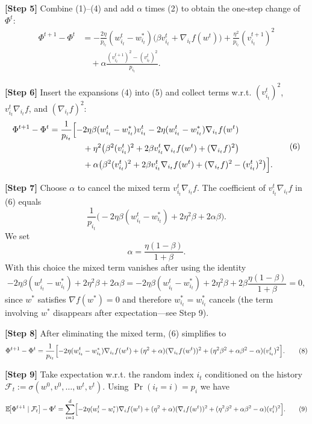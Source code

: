 \documentclass{article}
\newcommand{\E}{\mathbb{E}}
\begin{document}
\noindent\textbf{[Step 5]} Combine (1)–(4) and add $\alpha$ times (2) to obtain the one‑step change of $\Phi^{t}$:
\[
\begin{aligned}
\Phi^{t+1}-\Phi^{t}
&= -\frac{2\eta}{p_{i_t}}(w^{t}_{i_t}-w^{*}_{i_t})\bigl(\beta v^{t}_{i_t}+ \nabla_{i_t}f(w^{t})\bigr)
   +\frac{\eta^{2}}{p_{i_t}}(v^{t+1}_{i_t})^{2}   \\
&\quad +\alpha\frac{(v^{t+1}_{i_t})^{2}-(v^{t}_{i_t})^{2}}{p_{i_t}} .
\end{aligned}
\tag{5}
\]

\noindent\textbf{[Step 6]} Insert the expansions (4) into (5) and collect terms w.r.t. $(v^{t}_{i_t})^{2}$, $v^{t}_{i_t}\nabla_{i_t}f$, and $(\nabla_{i_t}f)^{2}$:
\[
\begin{aligned}
\Phi^{t+1}-\Phi^{t}
&= \frac{1}{p_{i_t}}\Bigl[
   -2\eta\beta (w^{t}_{i_t}-w^{*}_{i_t})v^{t}_{i_t}
   -2\eta (w^{t}_{i_t}-w^{*}_{i_t})\nabla_{i_t}f(w^{t})  \\
&\qquad\qquad
   +\eta^{2}\bigl(\beta^{2}(v^{t}_{i_t})^{2}+2\beta v^{t}_{i_t}\nabla_{i_t}f(w^{t})+(\nabla_{i_t}f)^{2}\bigr) \\
&\qquad\qquad
   +\alpha\bigl(\beta^{2}(v^{t}_{i_t})^{2}+2\beta v^{t}_{i_t}\nabla_{i_t}f(w^{t})+(\nabla_{i_t}f)^{2}-(v^{t}_{i_t})^{2}\bigr)
   \Bigr].
\end{aligned}
\tag{6}
\]

\noindent\textbf{[Step 7]} Choose $\alpha$ to cancel the mixed term $v^{t}_{i_t}\nabla_{i_t}f$.  
The coefficient of $v^{t}_{i_t}\nabla_{i_t}f$ in (6) equals
\[
\frac{1}{p_{i_t}}\bigl(-2\eta\beta (w^{t}_{i_t}-w^{*}_{i_t}) + 2\eta^{2}\beta +2\alpha\beta\bigr).
\]
We set
\[
\alpha = \frac{\eta(1-\beta)}{1+\beta}.
\tag{7}
\]
With this choice the mixed term vanishes after using the identity
\[
-2\eta\beta (w^{t}_{i_t}-w^{*}_{i_t}) + 2\eta^{2}\beta +2\alpha\beta
= -2\eta\beta (w^{t}_{i_t}-w^{*}_{i_t}) + 2\eta^{2}\beta +2\beta\frac{\eta(1-\beta)}{1+\beta}=0,
\]
since $w^{*}$ satisfies $\nabla f(w^{*})=0$ and therefore $w^{*}_{i_t}=w^{*}_{i_t}$ cancels (the term involving $w^{*}$ disappears after expectation—see Step 9).  

\noindent\textbf{[Step 8]} After eliminating the mixed term, (6) simplifies to
\[
\Phi^{t+1}-\Phi^{t}
= \frac{1}{p_{i_t}}\Bigl[
   -2\eta (w^{t}_{i_t}-w^{*}_{i_t})\nabla_{i_t}f(w^{t})
   +(\eta^{2}+\alpha)(\nabla_{i_t}f(w^{t}))^{2}
   +(\eta^{2}\beta^{2}+\alpha\beta^{2}-\alpha)(v^{t}_{i_t})^{2}
   \Bigr].
\tag{8}
\]

\noindent\textbf{[Step 9]} Take expectation w.r.t. the random index $i_t$ conditioned on the history $\mathcal{F}_t:=\sigma(w^{0},v^{0},\dots ,w^{t},v^{t})$.
Using $\Pr(i_t=i)=p_i$ we have
\[
\E\!\bigl[\Phi^{t+1}\mid \mathcal{F}_t\bigr]-\Phi^{t}
= \sum_{i=1}^{d}\Bigl[
   -2\eta (w^{t}_{i}-w^{*}_{i})\nabla_{i}f(w^{t})
   +(\eta^{2}+\alpha)(\nabla_{i}f(w^{t}))^{2}
   +(\eta^{2}\beta^{2}+\alpha\beta^{2}-\alpha)(v^{t}_{i})^{2}
   \Bigr].
\tag{9}
\]
\end{document}
